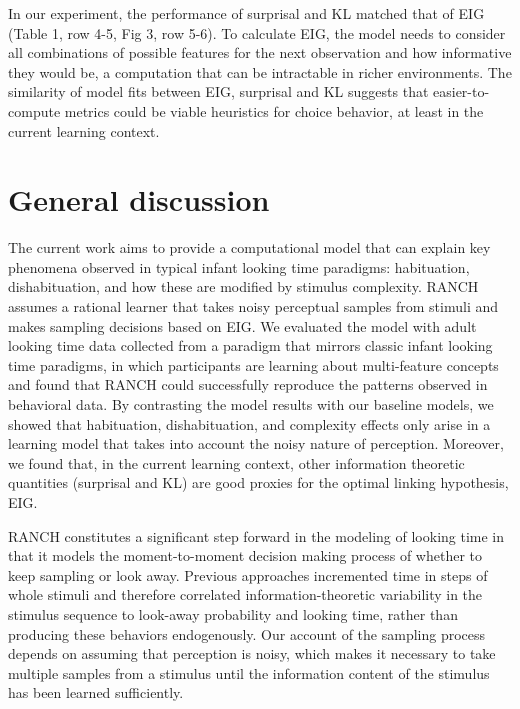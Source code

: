 \documentclass[10pt, letterpaper]{article}
\begin{document}
In our experiment, the performance of surprisal and KL matched that of
EIG (Table 1, row 4-5, Fig 3, row 5-6). To calculate EIG, the model
needs to consider all combinations of possible features for the next
observation and how informative they would be, a computation that can be
intractable in richer environments. The similarity of model fits between
EIG, surprisal and KL suggests that easier-to-compute metrics could be
viable heuristics for choice behavior, at least in the current learning
context.

\hypertarget{general-discussion}{%
\section{General discussion}\label{general-discussion}}

The current work aims to provide a computational model that can explain
key phenomena observed in typical infant looking time paradigms:
habituation, dishabituation, and how these are modified by stimulus
complexity. RANCH assumes a rational learner that takes noisy perceptual
samples from stimuli and makes sampling decisions based on EIG. We
evaluated the model with adult looking time data collected from a
paradigm that mirrors classic infant looking time paradigms, in which
participants are learning about multi-feature concepts and found that
RANCH could successfully reproduce the patterns observed in behavioral
data. By contrasting the model results with our baseline models, we
showed that habituation, dishabituation, and complexity effects only
arise in a learning model that takes into account the noisy nature of
perception. Moreover, we found that, in the current learning context,
other information theoretic quantities (surprisal and KL) are good
proxies for the optimal linking hypothesis, EIG.

RANCH constitutes a significant step forward in the modeling of looking
time in that it models the moment-to-moment decision making process of
whether to keep sampling or look away. Previous approaches incremented
time in steps of whole stimuli and therefore correlated
information-theoretic variability in the stimulus sequence to look-away
probability and looking time, rather than producing these behaviors
endogenously. Our account of the sampling process depends on assuming
that perception is noisy, which makes it necessary to take multiple
samples from a stimulus until the information content of the stimulus
has been learned sufficiently.
\end{document}
